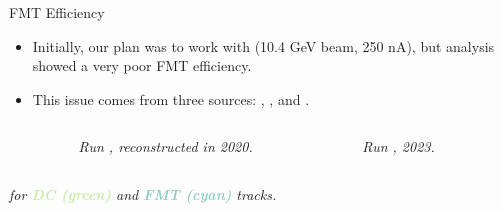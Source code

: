 \begin{frame}{FMT Efficiency}
    \label{11.41::summary}

    \begin{itemize}
        \item
            Initially, our plan was to work with  (10.4 GeV beam, 250 nA), but analysis showed a very poor FMT efficiency.

        \item
            This issue comes from three sources: , , and .
    \end{itemize}

    \vspace{-12pt}
    \begin{columns}[onlytextwidth,T]

    \begin{column}{.05\linewidth}\end{column} %

    \begin{column}{.49\linewidth}
        \begin{center}
            \begin{figure}[t]
                \scriptsize{\textit{Run , reconstructed in 2020.}}
            \end{figure}
        \end{center}
    \end{column}

    \begin{column}{.29\linewidth}
        \begin{center}
            \begin{figure}[t]
                \scriptsize{\textit{Run , 2023.}}
            \end{figure}
        \end{center}
    \end{column}

    \begin{column}{.05\linewidth}\end{column} %

    \end{columns}
    \begin{center}
        \scriptsize{\textit{
             for \textbf{\textcolor[HTML]{c7eca6}{DC (green)}} and \textbf{\textcolor[HTML]{8dcfbf}{FMT (cyan)}} tracks.
        }}
    \end{center}
\end{frame}

